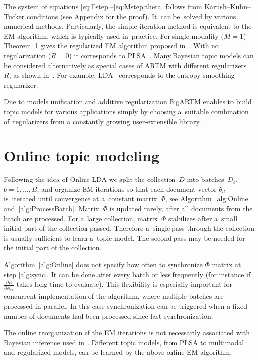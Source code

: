 \documentclass[russian]{llncs}
\begin{document}
The system of equations \eqref{eq:Estep}--\eqref{eq:Mstep:theta}
follows from Karush--Kuhn--Tucker conditions (see Appendix for the proof).
It~can be~solved by various numerical methods.
Particularly,
the simple-iteration method is equivalent to the EM algorithm,
which is typically used in~practice.
For single modality (${M=1}$) Theorem~1 gives the regularized EM algorithm
proposed in~\cite{voron14dan-eng}.
With no regularization (${R=0}$) it corresponds to PLSA~\cite{hofmann99plsi}.
Many Bayesian topic models can be considered alternatively
as special cases of ARTM with different regularizers~$R$,
as shown in~\cite{voron14aist,voron14mlj}.
For example,
LDA~\cite{blei03latent} corresponds to the entropy smoothing regularizer.

Due to models unification and additive regularization
BigARTM enables to build topic models for various applications
simply by choosing a~suitable combination of~regularizers
from a constantly growing user-extensible library.

\section{Online topic modeling}
\label{sec:Online}

Following the idea of Online LDA \cite{hoffman10online}
we split the collection~$D$ into batches~$D_b$, ${b=1,\dots,B}$,
and organize EM iterations so that
each document vector $\theta_d$ is~iterated until convergence at a~constant matrix~$\Phi$,
see Algorithm~\ref{alg:Online} and~\ref{alg:ProcessBatch}.
Matrix~$\Phi$ is updated rarely, after all documents from the batch are processed.
For a~large collection,
matrix~$\Phi$ stabilizes after a~small initial part of the collection passed.
Therefore a~single pass through the collection is usually sufficient to learn a~topic model.
The second pass may be needed for the initial part of the collection.

Algorithm~\ref{alg:Online} does not specify how often to synchronize $\Phi$ matrix at step \ref{alg:sync}.
It can be done after every batch or less frequently
(for instance if $\frac{\partial R}{\partial \phi_{wt}}$ takes long time to evaluate).
This flexibility is especially important for concurrent implementation of the algorithm,
where multiple batches are processed in parallel.
In this case synchronization can be triggered when a fixed number of documents had been processed since last synchronization.

The online reorganization of the EM iterations
is not necessarily associated with Bayesian inference used in~\cite{hoffman10online}.
Different topic models, from PLSA to multimodal and regularized models,
can be learned by the above online EM algorithm.
\end{document}
